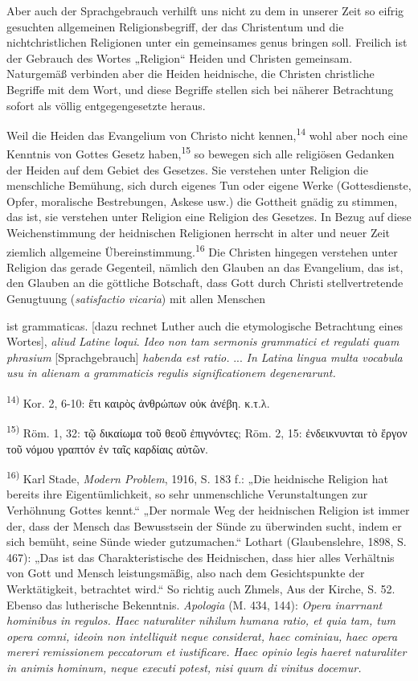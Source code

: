 \pagestyle{fancy}\fancyfoot[C]{}\renewcommand{\headrulewidth}{0pt}Aber auch der Sprachgebrauch verhilft uns nicht zu dem in unserer Zeit so eifrig gesuchten allgemeinen Religionsbegriff, der das Christentum und die nichtchristlichen Religionen unter ein gemeinsames genus bringen soll. Freilich ist der Gebrauch des Wortes „Religion“ Heiden und Christen gemeinsam. Naturgemäß verbinden aber die Heiden heidnische, die Christen christliche Begriffe mit dem Wort, und diese Begriffe stellen sich bei näherer Betrachtung sofort als völlig entgegengesetzte heraus.\par Weil die Heiden das Evangelium von Christo nicht kennen,\textsuperscript{14} wohl aber noch eine Kenntnis von Gottes Gesetz haben,\textsuperscript{15} so bewegen sich alle religiösen Gedanken der Heiden auf dem Gebiet des Gesetzes. Sie verstehen unter Religion die menschliche Bemühung, sich durch eigenes Tun oder eigene Werke (Gottesdienste, Opfer, moralische Bestrebungen, Askese usw.) die Gottheit gnädig zu stimmen, das ist, sie verstehen unter Religion eine Religion des Gesetzes. In Bezug auf diese Weichenstimmung der heidnischen Religionen herrscht in alter und neuer Zeit ziemlich allgemeine Übereinstimmung.\textsuperscript{16} Die Christen hingegen verstehen unter Religion das gerade Gegenteil, nämlich den Glauben an das Evangelium, das ist, den Glauben an die göttliche Botschaft, dass Gott durch Christi stellvertretende Genugtuung (\emph{satisfactio vicaria}) mit allen Menschen\par ist grammaticas. [dazu rechnet Luther auch die etymologische Betrachtung eines Wortes], \emph{aliud Latine loqui}. \emph{Ideo non tam sermonis grammatici et regulati quam phrasium} [Sprachgebrauch] \emph{habenda est ratio.} ... \emph{In Latina lingua multa vocabula usu in alienam a grammaticis regulis significationem degenerarunt.}\par\vspace{1em}\noindent\textsuperscript{14)} Kor. 2, 6-10: ἔτι καιρὸς ἀνθρώπων οὐκ ἀνέβη. κ.τ.λ.\par\textsuperscript{15)} Röm. 1, 32: τῷ δικαίωμα τοῦ θεοῦ ἐπιγνόντες; Röm. 2, 15: ἐνδεικνυνται τὸ ἔργον τοῦ νόμου γραπτόν ἐν ταῖς καρδίαις αὑτῶν.\par\textsuperscript{16)} Karl Stade, \emph{Modern Problem}, 1916, S. 183 f.: „Die heidnische Religion hat bereits ihre Eigentümlichkeit, so sehr unmenschliche Verunstaltungen zur Verhöhnung Gottes kennt.“ „Der normale Weg der heidnischen Religion ist immer der, dass der Mensch das Bewusstsein der Sünde zu überwinden sucht, indem er sich bemüht, seine Sünde wieder gutzumachen.“ Lothart (Glaubenslehre, 1898, S. 467): „Das ist das Charakteristische des Heidnischen, dass hier alles Verhältnis von Gott und Mensch leistungsmäßig, also nach dem Gesichtspunkte der Werktätigkeit, betrachtet wird.“ So richtig auch Zhmels, Aus der Kirche, S. 52. Ebenso das lutherische Bekenntnis. \emph{Apologia} (M. 434, 144): \emph{Opera inarrnant hominibus in regulos. Haec naturaliter nihilum humana ratio, et quia tam, tum opera comni, ideoin non intelliquit neque considerat, haec cominiau, haec opera mereri remissionem peccatorum et iustificare. Haec opinio legis haeret naturaliter in animis hominum, neque executi potest, nisi quum di vinitus docemur.}